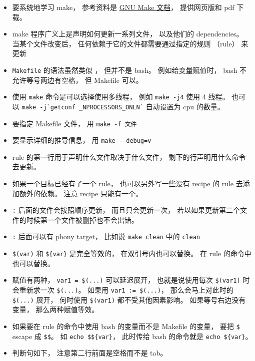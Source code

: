 


\begin{itemize}
\item 要系统地学习 make， 参考资料是 \href{https://www.gnu.org/software/make/manual/}{GNU Make 文档}， 提供网页版和 pdf 下载。
\item make 程序广义上是声明如何更新一系列文件， 以及他们的 dependencies。 当某个文件改变后， 任何依赖于它的文件都需要通过指定的规则 （rule） 来更新
\item \verb`Makefile` 的语法虽然类似 ， 但并不是 bash。 例如给变量赋值时， bash 不允许等号两边有空格， 但 Makefile 可以。
\item 使用 \verb`make` 命令是可以选择使用多线程， 例如 \verb`make -j4` 使用 4 线程。 也可以 \verb|make -j`getconf _NPROCESSORS_ONLN`| 自动设置为 cpu 的数量。
\item 要指定 Makefile 文件， 用 \verb`make -f 文件`
\item 要显示详细的推导信息， 用 \verb`make --debug=v`
\item rule 的第一行用于声明什么文件取决于什么文件， 剩下的行声明用什么命令去更新。
\item 如果一个目标已经有了一个 rule， 也可以另外写一些没有 recipe 的 rule 去添加额外的依赖。 注意 recipe 只能有一个。
\item \verb`:` 后面的文件会按照顺序更新， 而且只会更新一次， 若以如果更新第二个文件的时候第一个文件被删掉也不会出错。
\item \verb`:` 后面可以有 phony target， 比如说 \verb`make clean` 中的 \verb`clean`
\item \verb`$(var)` 和 \verb`${var}` 是完全等效的， 在双引号内也可以替换。 在 rule 的命令中也可以替换。
\item 赋值有两种， \verb`var1 = $(...)` 可以延迟展开， 也就是说使用每次 \verb`$(var1)` 时会重新求一次 \verb`$(...)`。 如果用 \verb`var1 := $(...)`， 那么会马上对此时的 \verb`$(...)` 展开， 何时使用 \verb`$(var1)` 都不受其他因素影响。 如果等号右边没有变量， 那么两种赋值等效。
\item 如果要在 rule 的命令中使用 bash 的变量而不是 Makefile 的变量， 要把 \verb`$` escape 成 \verb`$$`。 如 \verb`echo $${var}`， 此时传给 bash 的命令就是 \verb`echo ${var}`。
\item 判断句如下， 注意第二行前面是空格而不是 tab。

\end{itemize}
